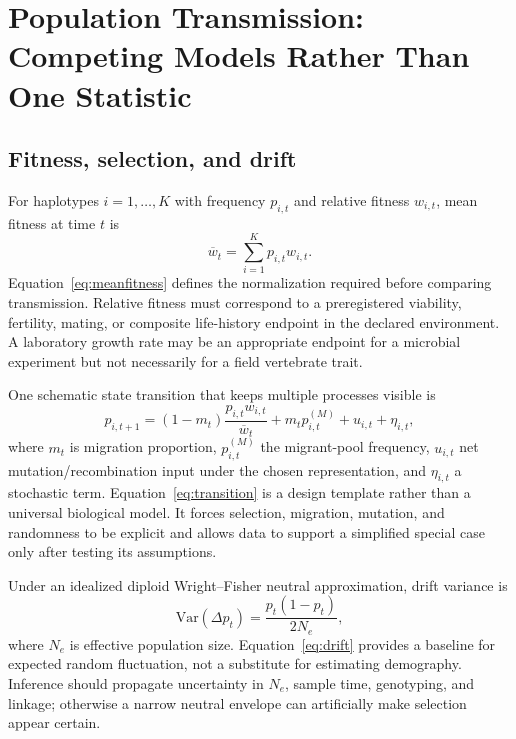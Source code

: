 \documentclass[conference]{IEEEtran}
\begin{document}
\section{Population Transmission: Competing Models Rather Than One Statistic}

\subsection{Fitness, selection, and drift}

For haplotypes $i=1,\ldots,K$ with frequency $p_{i,t}$ and relative fitness $w_{i,t}$, mean fitness at time $t$ is
\begin{equation}
\overline{w}_{t}=\sum_{i=1}^{K}p_{i,t}w_{i,t}.
\label{eq:meanfitness}
\end{equation}
Equation~\eqref{eq:meanfitness} defines the normalization required before comparing transmission. Relative fitness must correspond to a preregistered viability, fertility, mating, or composite life-history endpoint in the declared environment. A laboratory growth rate may be an appropriate endpoint for a microbial experiment but not necessarily for a field vertebrate trait.

One schematic state transition that keeps multiple processes visible is
\begin{equation}
p_{i,t+1}=(1-m_t)\frac{p_{i,t}w_{i,t}}{\overline{w}_{t}}+m_t p^{(M)}_{i,t}+u_{i,t}+\eta_{i,t},
\label{eq:transition}
\end{equation}
where $m_t$ is migration proportion, $p^{(M)}_{i,t}$ the migrant-pool frequency, $u_{i,t}$ net mutation/recombination input under the chosen representation, and $\eta_{i,t}$ a stochastic term. Equation~\eqref{eq:transition} is a design template rather than a universal biological model. It forces selection, migration, mutation, and randomness to be explicit and allows data to support a simplified special case only after testing its assumptions.

Under an idealized diploid Wright--Fisher neutral approximation, drift variance is
\begin{equation}
\mathrm{Var}\left(\Delta p_t\right)=\frac{p_t(1-p_t)}{2N_e},
\label{eq:drift}
\end{equation}
where $N_e$ is effective population size. Equation~\eqref{eq:drift} provides a baseline for expected random fluctuation, not a substitute for estimating demography. Inference should propagate uncertainty in $N_e$, sample time, genotyping, and linkage; otherwise a narrow neutral envelope can artificially make selection appear certain.
\end{document}
